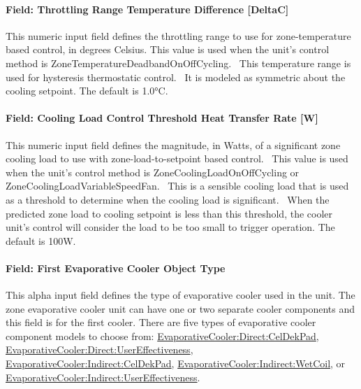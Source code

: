 \paragraph{Field: Throttling Range Temperature Difference {[}DeltaC{]}}\label{field-throttling-range-temperature-difference-deltac}

This numeric input field defines the throttling range to use for zone-temperature based control, in degrees Celsius. This value is used when the unit's control method is ZoneTemperatureDeadbandOnOffCycling.~ This temperature range is used for hysteresis thermostatic control.~ It is modeled as symmetric about the cooling setpoint. The default is 1.0\si{\degreeCelsius}.

\paragraph{Field: Cooling Load Control Threshold Heat Transfer Rate {[}W{]}}\label{field-cooling-load-control-threshold-heat-transfer-rate-w}

This numeric input field defines the magnitude, in Watts, of a significant zone cooling load to use with zone-load-to-setpoint based control.~ This value is used when the unit's control method is ZoneCoolingLoadOnOffCycling or ZoneCoolingLoadVariableSpeedFan.~ This is a sensible cooling load that is used as a threshold to determine when the cooling load is significant.~ When the predicted zone load to cooling setpoint is less than this threshold, the cooler unit's control will consider the load to be too small to trigger operation. The default is 100W.

\paragraph{Field: First Evaporative Cooler Object Type}\label{field-first-evaporative-cooler-object-type}

This alpha input field defines the type of evaporative cooler used in the unit. The zone evaporative cooler unit can have one or two separate cooler components and this field is for the first cooler. There are five types of evaporative cooler component models to choose from: \hyperref[evaporativecoolerdirectceldekpad]{EvaporativeCooler:Direct:CelDekPad}, \hyperref[evaporativecoolerdirectusereffectiveness]{EvaporativeCooler:Direct:UserEffectiveness}, \hyperref[evaporativecoolerindirectceldekpad]{EvaporativeCooler:Indirect:CelDekPad}, \hyperref[evaporativecoolerindirectwetcoil]{EvaporativeCooler:Indirect:WetCoil}, or \hyperref[evaporativecoolerindirectusereffectiveness]{EvaporativeCooler:Indirect:UserEffectiveness}.

